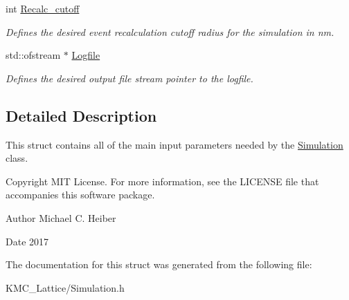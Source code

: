 \begin{DoxyCompactItemize}
\mbox{\label{struct_parameters___simulation_af55371ca9e7027e799f5be46e40eacc1}} 
int \hyperlink{struct_parameters___simulation_af55371ca9e7027e799f5be46e40eacc1}{Recalc\+\_\+cutoff}
\begin{DoxyCompactList}\small\item\em Defines the desired event recalculation cutoff radius for the simulation in nm. \end{DoxyCompactList}\item 
\mbox{\label{struct_parameters___simulation_aa491c1f8ca5045b4cc9c8bbfcb930024}} 
std\+::ofstream $\ast$ \hyperlink{struct_parameters___simulation_aa491c1f8ca5045b4cc9c8bbfcb930024}{Logfile}
\begin{DoxyCompactList}\small\item\em Defines the desired output file stream pointer to the logfile. \end{DoxyCompactList}\end{DoxyCompactItemize}


\subsection{Detailed Description}
This struct contains all of the main input parameters needed by the \hyperlink{class_simulation}{Simulation} class. 

\begin{DoxyCopyright}{Copyright}
M\+IT License. For more information, see the L\+I\+C\+E\+N\+SE file that accompanies this software package. 
\end{DoxyCopyright}
\begin{DoxyAuthor}{Author}
Michael C. Heiber 
\end{DoxyAuthor}
\begin{DoxyDate}{Date}
2017 
\end{DoxyDate}


The documentation for this struct was generated from the following file\+:\begin{DoxyCompactItemize}
\item 
K\+M\+C\+\_\+\+Lattice/Simulation.\+h\end{DoxyCompactItemize}
